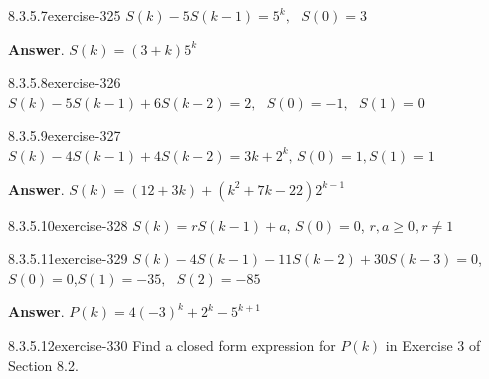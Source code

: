 \documentclass[twoside,10pt,]{book}
\numberwithin{equation}{section}
\begin{document}
\begin{exercisegroup}
\begin{divisionsolutioneg}{8.3.5.7}{}{exercise-325}%
\hypertarget{p-2719}{}%
\(S(k) - 5S (k - 1) = 5^k,\textrm{  }S(0) = 3\)%
\par\smallskip%
\noindent\textbf{Answer}.\quad%
\hypertarget{p-2720}{}%
\(S(k)=(3+k)5^k\)%
\end{divisionsolutioneg}%
\begin{divisionsolutioneg}{8.3.5.8}{}{exercise-326}%
\hypertarget{p-2721}{}%
\(S(k) - 5S(k - 1) + 6S(k - 2) = 2,\textrm{  }S(0) = -1,\textrm{  }S(1) = 0\)%
\end{divisionsolutioneg}%
\begin{divisionsolutioneg}{8.3.5.9}{}{exercise-327}%
\hypertarget{p-2722}{}%
\(S(k) - 4S(k - 1) + 4S(k - 2) = 3k + 2^k \textrm{,  }S(0) = 1, S(1) = 1\)%
\par\smallskip%
\noindent\textbf{Answer}.\quad%
\hypertarget{p-2723}{}%
\(S(k)=(12+3k)+\left(k^2+7k-22\right)2^{k-1}\)%
\end{divisionsolutioneg}%
\begin{divisionsolutioneg}{8.3.5.10}{}{exercise-328}%
\hypertarget{p-2724}{}%
\(S(k) = r S(k - 1) + a\), \(S(0) = 0\), \(r, a \geq  0, r \neq  1\)%
\end{divisionsolutioneg}%
\begin{divisionsolutioneg}{8.3.5.11}{}{exercise-329}%
\hypertarget{p-2725}{}%
\(S(k) - 4S(k - 1) - 11S(k- 2)+ 30S(k - 3) = 0\), \(S(0) = 0\),\(S(1) = -35,\textrm{  }S(2) = -85\)%
\par\smallskip%
\noindent\textbf{Answer}.\quad%
\hypertarget{p-2726}{}%
\(P(k)=4(-3)^k+2^k-5^{k+1}\)%
\end{divisionsolutioneg}%
\end{exercisegroup}
\par\medskip\noindent
\begin{divisionsolution}{8.3.5.12}{}{exercise-330}%
\hypertarget{p-2727}{}%
Find a closed form expression for \(P(k)\) in Exercise 3 of Section 8.2.%
\end{divisionsolution}%
\end{document}
